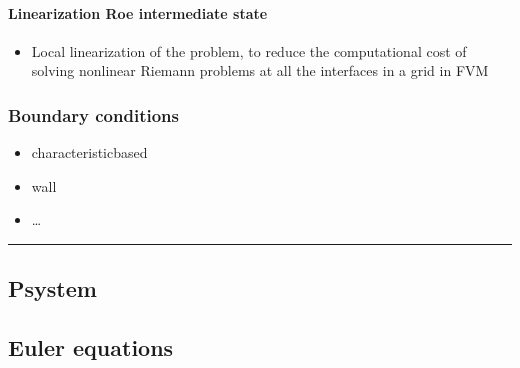 \documentclass[letterpaper,10pt,english]{jupyterBook}
\begin{document}
\paragraph{Linearization \sphinxhyphen{} Roe intermediate state}
\label{\detokenize{ch/pde/hyperbolic-nd-draft:linearization-roe-intermediate-state}}\label{\detokenize{ch/pde/hyperbolic-nd-draft:pde-hyperbolic-nd-draft-riemann-roe}}\begin{itemize}
\item {} 
\sphinxAtStartPar
Local linearization of the problem, to reduce the computational cost of solving non\sphinxhyphen{}linear Riemann problems at all the interfaces in a grid in FVM

\end{itemize}


\subsubsection{Boundary conditions}
\label{\detokenize{ch/pde/hyperbolic-nd-draft:boundary-conditions}}\label{\detokenize{ch/pde/hyperbolic-nd-draft:pde-hyperbolic-nd-draft-bc}}\begin{itemize}
\item {} 
\sphinxAtStartPar
characteristic\sphinxhyphen{}based

\item {} 
\sphinxAtStartPar
wall

\item {} 
\sphinxAtStartPar
…

\end{itemize}


\bigskip\hrule\bigskip


\sphinxstepscope


\subsection{P\sphinxhyphen{}system}
\label{\detokenize{ch/pde/hyperbolic-nd-psys:p-system}}\label{\detokenize{ch/pde/hyperbolic-nd-psys:pde-hyperbolic-nd-psys}}\label{\detokenize{ch/pde/hyperbolic-nd-psys::doc}}
\sphinxstepscope


\subsection{Euler equations}
\label{\detokenize{ch/pde/hyperbolic-nd-euler:euler-equations}}\label{\detokenize{ch/pde/hyperbolic-nd-euler:pde-hyperbolic-nd-euler}}\label{\detokenize{ch/pde/hyperbolic-nd-euler::doc}}
\end{document}
